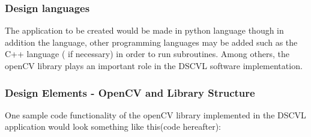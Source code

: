 \documentclass[10pt,draftclsnofoot,onecolumn,journal,compsoc]{IEEEtran}
\begin{document}
      	\subsubsection{Design languages}
   The application to be created would be made in python language though in addition the language, other programming languages  may be added such as the C++ language ( if necessary) in order to run subroutines. Among others, the openCV library plays an important role in the DSCVL software implementation.
   
      \subsubsection{Design Elements - OpenCV and Library Structure}\label{des:LibStructure}
 One sample code functionality of the openCV library implemented in the DSCVL application would look something like this(code hereafter): 
 
\end{document}
